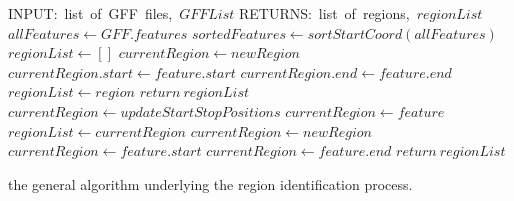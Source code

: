 \begin{algorithm}
  \begin{algorithmic}
    \State INPUT:\ list\ of\ GFF\ files,\ $GFFList$
    \State RETURNS:\ list\ of\ regions,\ $regionList$
    \State $allFeatures \gets GFF.features$
    \EndFor
    \State $sortedFeatures \gets sortStartCoord(allFeatures)$
    \State $regionList \gets []$
        \State $currentRegion \gets newRegion$
        \State $currentRegion.start \gets feature.start$
        \State $currentRegion.end \gets feature.end$
        \State $regionList \gets region$
        \State $return\ regionList$
        \State $currentRegion \gets updateStartStopPositions$
        \State $currentRegion \gets feature$
      \Else
        \State $regionList \gets currentRegion$
        \State $currentRegion \gets newRegion$
        \State $currentRegion \gets feature.start$
        \State $currentRegion \gets feature.end$
      \EndIf
    \EndFor
    \State $return\ regionList$
  \end{algorithmic}
  \caption{the general algorithm underlying the region identification
    process.}
  \label{alg:regions}
\end{algorithm}

